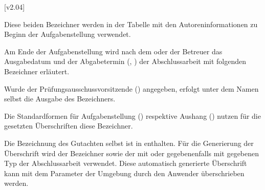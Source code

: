 \begin{DeclareEntity}{}
\begin{Declaration}
  {}
  [v2.04]
\begin{Declaration}
  {}
\printdeclarationlist

Diese beiden Bezeichner werden in der Tabelle mit den Autoreninformationen zu 
Beginn der Aufgabenstellung verwendet.
%
\end{Declaration}
\end{Declaration}

\begin{Declaration}
  {}
\begin{Declaration}
  {}
\printdeclarationlist

Am Ende der Aufgabenstellung wird nach dem oder der Betreuer das Ausgabedatum 
und der Abgabetermin (, ) der Abschlussarbeit 
mit folgenden Bezeichner erläutert.
%
\end{Declaration}
\end{Declaration}

\begin{Declaration}
  {}
\printdeclarationlist

Wurde der Prüfungsausschussvorsitzende () angegeben, erfolgt 
unter dem Namen selbst die Ausgabe des Bezeichners.
%
\end{Declaration}

\begin{Declaration}
  {}
\begin{Declaration}
  {}
\printdeclarationlist

Die Standardformen für Aufgabenstellung () respektive Aushang 
() nutzen für die gesetzten Überschriften diese Bezeichner.
%
\end{Declaration}
\end{Declaration}

\begin{Declaration}
  {}
\begin{Declaration}
  {}
\printdeclarationlist

Die Bezeichnung des Gutachten selbst ist in  enthalten. 
Für die Generierung der Überschrift wird der Bezeichner  
sowie der mit  oder gegebenenfalls mit  gegebenen 
Typ der Abschlussarbeit verwendet. Diese automatisch generierte Überschrift 
kann mit dem Parameter  der 
Umgebung  durch den Anwender überschrieben werden.
%
\end{Declaration}
\end{Declaration}


\end{DeclareEntity}

